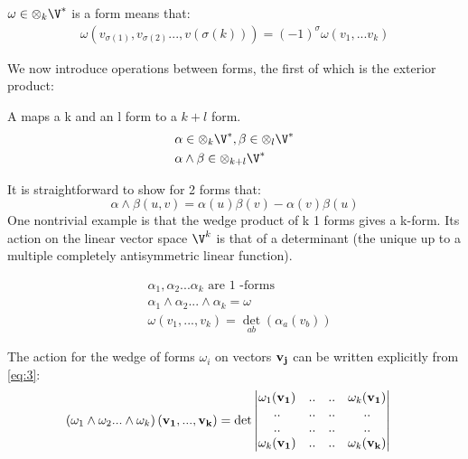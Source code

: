 \documentclass[11pt]{scrartcl}
\begin{document}
\begin{definition}
	$\omega \in \otimes_k \V^*$ is a form means that:
	\begin{align}
		\omega(v_{\sigma(1)}, v_{\sigma(2)} ..., v(\sigma(k)) ) = (-1)^\sigma \omega(v_1, ... v_k) 
	\end{align}
\end{definition}
We now introduce operations between forms, the first of which is the exterior product:
\begin{definition}
	A  maps a k and an l form to a $k + l$ form.
	\begin{align}
		& \alpha \in \otimes_k \V^*, \beta \in \otimes_l \V^* \\
		& \alpha \wedge \beta \in \otimes_{k+l} \V^* \\
	\end{align}
\end{definition}

\begin{example}
	It is straightforward to show for 2 forms that:
	$$ \alpha \wedge \beta (u, v) = \alpha(u) \beta(v) - \alpha(v) \beta(u)$$
	One nontrivial example is that the wedge product of k 1 forms gives a k-form.  Its action on the linear vector space $\V^k$ is that of a determinant (the unique up to a multiple completely antisymmetric linear function).
\end{example}

\begin{lemma}
	\begin{align}
		&\alpha_1, \alpha_2 ... \alpha_k \text{ are 1 -forms} \\
		& \alpha_1 \wedge \alpha_2 ... \wedge \alpha_k = \omega \\
		& \omega (v_1, ... , v_k) = \det_{ab} \left(\alpha_a(v_b) \right) \label{eq:3}
	\end{align}
\end{lemma}

\begin{example}
	The action for the wedge of forms $\omega_i$ on vectors $\bf{v}_j$ can be written explicitly from \ref{eq:3}:
	\begin{align}
		\left(\omega_1 \wedge \omega_2 ... \wedge \omega_k \right) \left( \bf{v_1}, ..., \bf{v_k} \right)
		&= \text{det} \begin{vmatrix}
			\omega_1(\bf{v_1}) & .. & .. & \omega_k(\bf{v_1}) \\ 
			.. & .. & .. & .. \\ 
			.. &  .. & .. & .. \\ 
			\omega_k(\bf{v_1}) & .. & .. & \omega_k(\bf{v_k}) \notag
		\end{vmatrix}
	\end{align}
\end{example}
\end{document}
